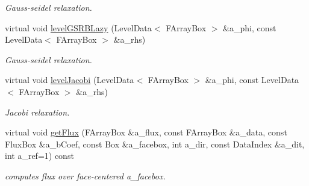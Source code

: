\begin{DoxyCompactItemize}
\begin{DoxyCompactList}\small\item\em Gauss-\/seidel relaxation. \end{DoxyCompactList}\item 
\hypertarget{class_a_m_r_non_linear_v_c_op_a0ebf9dc34f48b1e4e6e0b8b53d44c2c6}{virtual void \hyperlink{class_a_m_r_non_linear_v_c_op_a0ebf9dc34f48b1e4e6e0b8b53d44c2c6}{level\-G\-S\-R\-B\-Lazy} (Level\-Data$<$ F\-Array\-Box $>$ \&a\-\_\-phi, const Level\-Data$<$ F\-Array\-Box $>$ \&a\-\_\-rhs)}\label{class_a_m_r_non_linear_v_c_op_a0ebf9dc34f48b1e4e6e0b8b53d44c2c6}

\begin{DoxyCompactList}\small\item\em Gauss-\/seidel relaxation. \end{DoxyCompactList}\item 
\hypertarget{class_a_m_r_non_linear_v_c_op_a1c3aac6be1fe083f7dab208827cc703c}{virtual void \hyperlink{class_a_m_r_non_linear_v_c_op_a1c3aac6be1fe083f7dab208827cc703c}{level\-Jacobi} (Level\-Data$<$ F\-Array\-Box $>$ \&a\-\_\-phi, const Level\-Data$<$ F\-Array\-Box $>$ \&a\-\_\-rhs)}\label{class_a_m_r_non_linear_v_c_op_a1c3aac6be1fe083f7dab208827cc703c}

\begin{DoxyCompactList}\small\item\em Jacobi relaxation. \end{DoxyCompactList}\item 
\hypertarget{class_a_m_r_non_linear_v_c_op_a0926e9cc4f623acaa5a09fe9f1a46f3a}{virtual void \hyperlink{class_a_m_r_non_linear_v_c_op_a0926e9cc4f623acaa5a09fe9f1a46f3a}{get\-Flux} (F\-Array\-Box \&a\-\_\-flux, const F\-Array\-Box \&a\-\_\-data, const Flux\-Box \&a\-\_\-b\-Coef, const Box \&a\-\_\-facebox, int a\-\_\-dir, const Data\-Index \&a\-\_\-dit, int a\-\_\-ref=1) const }\label{class_a_m_r_non_linear_v_c_op_a0926e9cc4f623acaa5a09fe9f1a46f3a}

\begin{DoxyCompactList}\small\item\em computes flux over face-\/centered a\-\_\-facebox. \end{DoxyCompactList}\end{DoxyCompactItemize}
